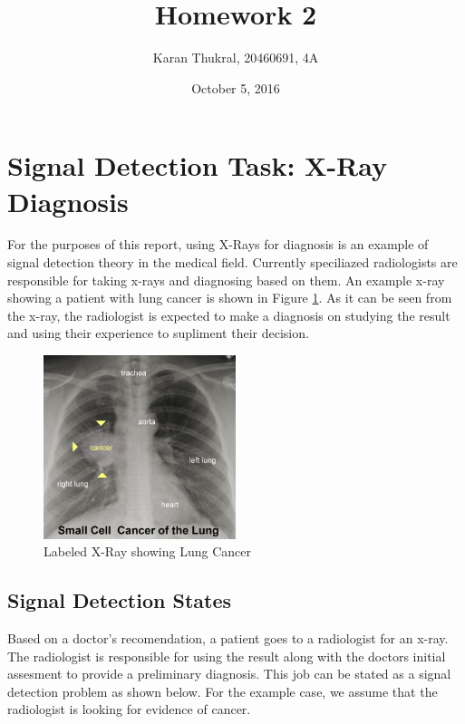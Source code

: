 \documentclass[12pt]{article}
\title{Homework 2}
\author{Karan Thukral, 20460691, 4A}
\date{October 5, 2016}
\begin{document}
	\makereporttitle


	\startarabicpagenumbers
	
	\section{Signal Detection Task: X-Ray Diagnosis}
	For the purposes of this report, using X-Rays for diagnosis is an example of signal detection theory in the medical field. Currently speciliazed radiologists are responsible for taking x-rays and diagnosing based on them. An example x-ray showing a patient with lung cancer is shown in Figure \ref{lungcancer}. As it can be seen from the x-ray, the radiologist is expected to make a diagnosis on studying the result and using their experience to supliment their decision.
	
	\begin{figure}[!ht]
		\centering
		\includegraphics[width=0.5\textwidth]{lungcancer}
		\caption{Labeled X-Ray showing Lung Cancer}
		\label{lungcancer}
	\end{figure}
	
	\subsection{Signal Detection States}
	Based on a doctor's recomendation, a patient goes to a radiologist for an x-ray. The radiologist is responsible for using the result along with the doctors initial assesment to provide a preliminary diagnosis. This job can be stated as a signal detection problem as shown below. For the example case, we assume that the radiologist is looking for evidence of cancer.
	
\end{document}
